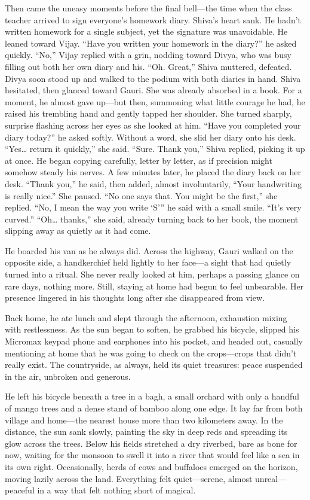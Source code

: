 Then came the uneasy moments before the final bell—the time when the class teacher arrived to sign everyone's homework diary. Shiva's heart sank. He hadn't written homework for a single subject, yet the signature was unavoidable. He leaned toward Vijay. ``Have you written your homework in the diary?'' he asked quickly. ``No,'' Vijay replied with a grin, nodding toward Divya, who was busy filling out both her own diary and his. ``Oh. Great,'' Shiva muttered, defeated. Divya soon stood up and walked to the podium with both diaries in hand. Shiva hesitated, then glanced toward Gauri. She was already absorbed in a book. For a moment, he almost gave up—but then, summoning what little courage he had, he raised his trembling hand and gently tapped her shoulder. She turned sharply, surprise flashing across her eyes as she looked at him. ``Have you completed your diary today?'' he asked softly. Without a word, she slid her diary onto his desk. ``Yes… return it quickly,'' she said. ``Sure. Thank you,'' Shiva replied, picking it up at once. He began copying carefully, letter by letter, as if precision might somehow steady his nerves. A few minutes later, he placed the diary back on her desk. ``Thank you,'' he said, then added, almost involuntarily, ``Your handwriting is really nice.'' She paused. ``No one says that. You might be the first,'' she replied. ``No, I mean the way you write `S''' he said with a small smile. ``It's very curved.'' ``Oh… thanks,'' she said, already turning back to her book, the moment slipping away as quietly as it had come.

He boarded his van as he always did. Across the highway, Gauri walked on the opposite side, a handkerchief held lightly to her face—a sight that had quietly turned into a ritual. She never really looked at him, perhaps a passing glance on rare days, nothing more. Still, staying at home had begun to feel unbearable. Her presence lingered in his thoughts long after she disappeared from view.

Back home, he ate lunch and slept through the afternoon, exhaustion mixing with restlessness. As the sun began to soften, he grabbed his bicycle, slipped his Micromax keypad phone and earphones into his pocket, and headed out, casually mentioning at home that he was going to check on the crops—crops that didn't really exist. The countryside, as always, held its quiet treasures: peace suspended in the air, unbroken and generous.

He left his bicycle beneath a tree in a bagh, a small orchard with only a handful of mango trees and a dense stand of bamboo along one edge. It lay far from both village and home—the nearest house more than two kilometers away. In the distance, the sun sank slowly, painting the sky in deep reds and spreading its glow across the trees. Below his fields stretched a dry riverbed, bare as bone for now, waiting for the monsoon to swell it into a river that would feel like a sea in its own right. Occasionally, herds of cows and buffaloes emerged on the horizon, moving lazily across the land. Everything felt quiet—serene, almost unreal—peaceful in a way that felt nothing short of magical.

